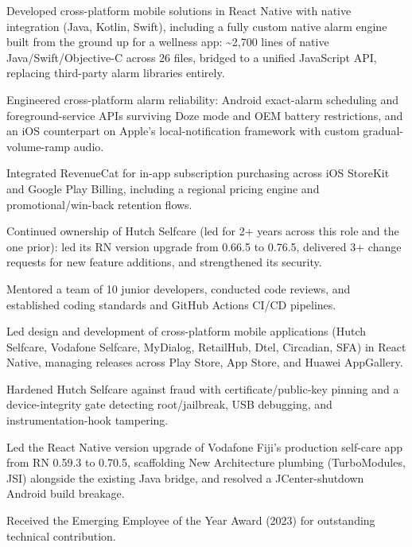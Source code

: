 \documentclass[10.5pt]{article}
\begin{document}
\begin{cvitems}
  \item Developed cross-platform mobile solutions in React Native with native integration (Java, Kotlin, Swift), including a fully custom native alarm engine built from the ground up for a wellness app: \textasciitilde2,700 lines of native Java/Swift/Objective-C across 26 files, bridged to a unified JavaScript API, replacing third-party alarm libraries entirely.
  \item Engineered cross-platform alarm reliability: Android exact-alarm scheduling and foreground-service APIs surviving Doze mode and OEM battery restrictions, and an iOS counterpart on Apple's local-notification framework with custom gradual-volume-ramp audio.
  \item Integrated RevenueCat for in-app subscription purchasing across iOS StoreKit and Google Play Billing, including a regional pricing engine and promotional/win-back retention flows.
  \item Continued ownership of Hutch Selfcare (led for 2+ years across this role and the one prior): led its RN version upgrade from 0.66.5 to 0.76.5, delivered 3+ change requests for new feature additions, and strengthened its security.
  \item Mentored a team of 10 junior developers, conducted code reviews, and established coding standards and GitHub Actions CI/CD pipelines.
\end{cvitems}

\begin{cvitems}
  \item Led design and development of cross-platform mobile applications (Hutch Selfcare, Vodafone Selfcare, MyDialog, RetailHub, Dtel, Circadian, SFA) in React Native, managing releases across Play Store, App Store, and Huawei AppGallery.
  \item Hardened Hutch Selfcare against fraud with certificate/public-key pinning and a device-integrity gate detecting root/jailbreak, USB debugging, and instrumentation-hook tampering.
  \item Led the React Native version upgrade of Vodafone Fiji's production self-care app from RN 0.59.3 to 0.70.5, scaffolding New Architecture plumbing (TurboModules, JSI) alongside the existing Java bridge, and resolved a JCenter-shutdown Android build breakage.
  \item Received the Emerging Employee of the Year Award (2023) for outstanding technical contribution.
\end{cvitems}
\end{document}
